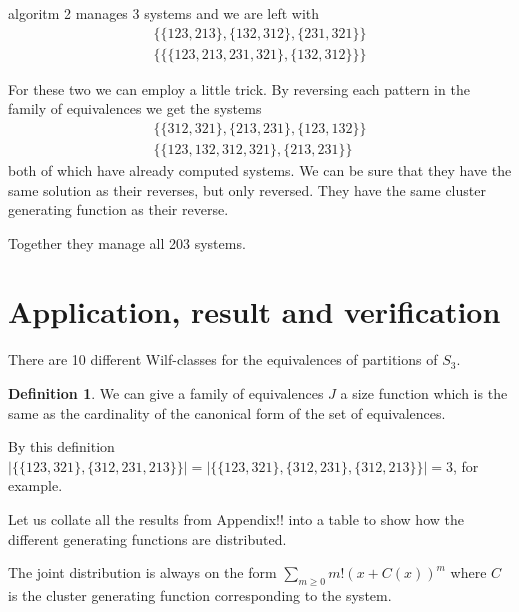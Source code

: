 \documentclass[openany, a4paper, 11pt, english]{article}
\theoremstyle{definition}
\newtheorem{definition}[theorem]{Definition}
\begin{document}
algoritm 2 manages 3 systems and we are left with
\begin{gather*}
    \{\{123,213\},\{132,312\},\{231,321\}\} \\
    \{\{\{123,213,231,321\},\{132,312\}\}\}
\end{gather*}

For these two we can employ a little trick. By reversing each pattern in the
family of equivalences we get the systems
\begin{gather*}
    \{\{312,321\},\{213,231\},\{123,132\}\} \\
    \{\{123,132,312,321\},\{213,231\}\}
\end{gather*}
both of which have already computed systems. We can be sure that they have the
same solution as their reverses, but only reversed. They have the same cluster
generating function as their reverse.

Together they manage all 203 systems.

\section{Application, result and verification}
There are 10 different Wilf-classes for the equivalences of partitions of $S_3$.

\begin{definition}
    We can give a family of equivalences $J$ a size function which is the same
    as the cardinality of the canonical form of the set of equivalences.

    By this definition $| \{ \{ 123, 321 \}, \{ 312, 231, 213 \} \}| = | \{ \{
    123, 321 \}, \{ 312, 231 \}, \{ 312, 213 \} \} | = 3$, for example.
\end{definition}

Let us collate all the results from Appendix!! into a table to show how the
different generating functions are distributed.

The joint distribution is always on the form $\sum_{m \geq 0}m!(x+C(x))^m$ where $C$
is the cluster generating function corresponding to the system.
\end{document}
